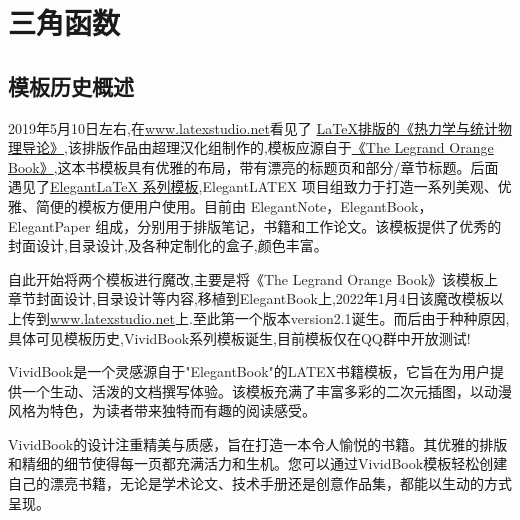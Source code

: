 \chapter{三角函数}

\section{模板历史概述}
2019年5月10日左右,在\href{latexstudio论坛}{www.latexstudio.net}看见了
\href{https://www.latexstudio.net/archives/10715.html}{LaTeX排版的《热力学与统计物理导论》},该排版作品由超理汉化组制作的,模板应源自于\href{http://www.latextemplates.com/template/the-legrand-orange-book}{《The Legrand Orange Book》},这本书模板具有优雅的布局，带有漂亮的标题页和部分/章节标题。后面遇见了\href{https://elegantlatex.org/}{Elegant\LaTeX{} 系列模板},ElegantLATEX 项目组致力于打造一系列美观、优雅、简便的模板方便用户使用。目前由
ElegantNote，ElegantBook，ElegantPaper 组成，分别用于排版笔记，书籍和工作论文。该模板提供了优秀的封面设计,目录设计,及各种定制化的盒子,颜色丰富。

自此开始将两个模板进行魔改,主要是将《The Legrand Orange Book》该模板上章节封面设计,目录设计等内容,移植到ElegantBook上,2022年1月4日该魔改模板以上传到\href{latexstudio论坛}{www.latexstudio.net}上.至此第一个版本version2.1诞生。而后由于种种原因,具体可见模板历史,VividBook系列模板诞生,目前模板仅在QQ群中开放测试!

VividBook是一个灵感源自于"ElegantBook"的LATEX书籍模板，它旨在为用户提供一个生动、活泼的文档撰写体验。该模板充满了丰富多彩的二次元插图，以动漫风格为特色，为读者带来独特而有趣的阅读感受。

VividBook的设计注重精美与质感，旨在打造一本令人愉悦的书籍。其优雅的排版和精细的细节使得每一页都充满活力和生机。您可以通过VividBook模板轻松创建自己的漂亮书籍，无论是学术论文、技术手册还是创意作品集，都能以生动的方式呈现。

